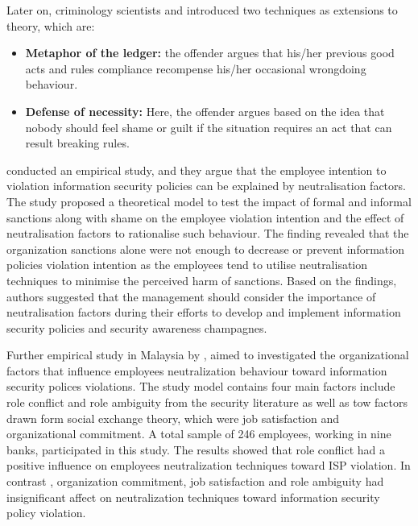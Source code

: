Later on, criminology scientists \cite{klockars1974} and \citet{Minor1981} introduced two techniques as extensions to \citet{Sykes1957} theory, which are:
\begin{itemize}
\item \textbf{Metaphor of the ledger:} the offender argues that his/her previous good acts and rules compliance recompense his/her occasional wrongdoing behaviour\citet{klockars1974}.
\item \textbf{Defense of necessity:} Here, the offender argues based on the idea that nobody should feel shame or guilt if the situation requires an act that can result breaking rules\cite{Minor1981}.
\end{itemize}


\citet{Siponen2010}conducted an empirical study, and they argue that the employee intention to violation information security policies can be explained by neutralisation factors. The study proposed a theoretical model to test the impact of formal and informal sanctions along with shame on the employee violation intention and the effect of neutralisation factors to rationalise such behaviour. The finding revealed that the organization sanctions alone were not enough to decrease or prevent information policies violation intention as the employees tend to utilise neutralisation techniques to minimise the perceived harm of sanctions. Based on the findings,  authors suggested that the management should consider the importance of neutralisation factors during their efforts to develop and implement information security policies and security awareness champagnes.      

Further empirical study in Malaysia by \citet{Teh2015}, aimed to investigated the organizational factors that influence employees neutralization behaviour toward information security polices violations. The study model contains four main  factors include role conflict and role ambiguity from the security literature as well as tow factors drawn form social exchange theory, which were job satisfaction and organizational commitment. A total sample of 246 employees, working in nine banks, participated in this study. The results showed that role conflict had a positive influence on employees neutralization techniques toward ISP violation. In contrast , organization commitment, job satisfaction and role ambiguity had insignificant affect on neutralization techniques toward information security policy violation. 

